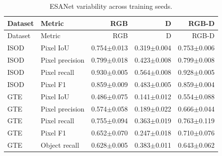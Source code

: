 \begin{longtable}{llrrr}
\caption{ESANet variability across training seeds.}\label{tab:domain-spread}\\
\toprule Dataset & Metric & RGB & D & RGB-D\\\midrule\endfirsthead
\toprule Dataset & Metric & RGB & D & RGB-D\\\midrule\endhead
ISOD & Pixel IoU & 0.754$\pm$0.013 & 0.319$\pm$0.004 & 0.753$\pm$0.006\\
ISOD & Pixel precision & 0.799$\pm$0.018 & 0.423$\pm$0.008 & 0.799$\pm$0.008\\
ISOD & Pixel recall & 0.930$\pm$0.005 & 0.564$\pm$0.008 & 0.928$\pm$0.005\\
ISOD & Pixel F1 & 0.859$\pm$0.009 & 0.483$\pm$0.005 & 0.859$\pm$0.004\\
GTE & Pixel IoU & 0.486$\pm$0.075 & 0.141$\pm$0.012 & 0.554$\pm$0.088\\
GTE & Pixel precision & 0.574$\pm$0.058 & 0.189$\pm$0.022 & 0.666$\pm$0.044\\
GTE & Pixel recall & 0.755$\pm$0.094 & 0.363$\pm$0.019 & 0.763$\pm$0.119\\
GTE & Pixel F1 & 0.652$\pm$0.070 & 0.247$\pm$0.018 & 0.710$\pm$0.076\\
GTE & Object recall & 0.628$\pm$0.005 & 0.383$\pm$0.011 & 0.643$\pm$0.062\\
\bottomrule\end{longtable}
